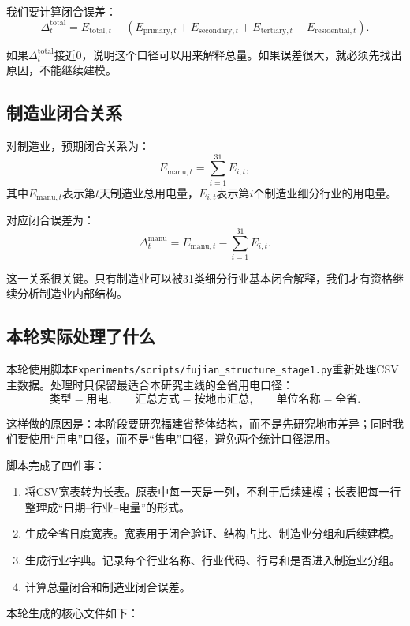 \documentclass[UTF8,a4paper,11pt]{ctexart}
\newcommand{\manu}{\mathrm{manu}}
\begin{document}
我们要计算闭合误差：
\[
\Delta^{\mathrm{total}}_t
=
E_{\mathrm{total},t}
-
\left(
E_{\mathrm{primary},t}
+
E_{\mathrm{secondary},t}
+
E_{\mathrm{tertiary},t}
+
E_{\mathrm{residential},t}
\right).
\]

如果$\Delta^{\mathrm{total}}_t$接近0，说明这个口径可以用来解释总量。如果误差很大，就必须先找出原因，不能继续建模。

\subsection{制造业闭合关系}

对制造业，预期闭合关系为：
\[
E_{\manu,t}
=
\sum_{i=1}^{31} E_{i,t},
\]
其中$E_{\manu,t}$表示第$t$天制造业总用电量，$E_{i,t}$表示第$i$个制造业细分行业的用电量。

对应闭合误差为：
\[
\Delta^{\manu}_t
=
E_{\manu,t}
-
\sum_{i=1}^{31} E_{i,t}.
\]

这一关系很关键。只有制造业可以被31类细分行业基本闭合解释，我们才有资格继续分析制造业内部结构。

\subsection{本轮实际处理了什么}

本轮使用脚本\texttt{Experiments/scripts/fujian\_structure\_stage1.py}重新处理CSV主数据。处理时只保留最适合本研究主线的全省用电口径：
\[
\text{类型}=\text{用电},\qquad
\text{汇总方式}=\text{按地市汇总},\qquad
\text{单位名称}=\text{全省}.
\]

这样做的原因是：本阶段要研究福建省整体结构，而不是先研究地市差异；同时我们要使用“用电”口径，而不是“售电”口径，避免两个统计口径混用。

脚本完成了四件事：
\begin{enumerate}
  \item 将CSV宽表转为长表。原表中每一天是一列，不利于后续建模；长表把每一行整理成“日期--行业--电量”的形式。
  \item 生成全省日度宽表。宽表用于闭合验证、结构占比、制造业分组和后续建模。
  \item 生成行业字典。记录每个行业名称、行业代码、行号和是否进入制造业分组。
  \item 计算总量闭合和制造业闭合误差。
\end{enumerate}

本轮生成的核心文件如下：
\end{document}
